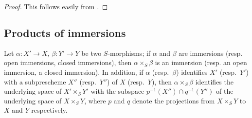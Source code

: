 \begin{proof}
This follows easily from .
\end{proof}

\subsection{Products of immersions}
\label{subsection:I.4.3}

\begin{proposition}[4.3.1]
\label{I.4.3.1}
Let $\alpha:X'\to X$, $\beta:Y'\to Y$ be two $S$-morphisms; if $\alpha$ and $\beta$ are immersions (resp. open immersions, closed immersions), then $\alpha\times_S\beta$ is an immersion (resp. an open immersion, a closed immersion).
In addition, if $\alpha$ (resp.~$\beta$) identifies $X'$ (resp.~$Y'$) with a subprescheme $X''$ (resp.~$Y''$) of $X$ (resp.~$Y$), then $\alpha\times_S\beta$ identifies the underlying space of $X'\times_S Y'$ with the subspace $p^{-1}(X'')\cap q^{-1}(Y'')$ of the underlying space of $X\times_S Y$, where $p$ and $q$ denote the projections from $X\times_S Y$ to $X$ and $Y$ respectively.
\end{proposition}

